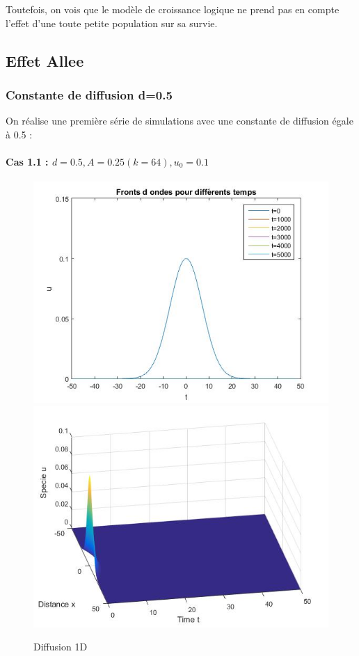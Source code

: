 \documentclass[a4paper,11pt]{article}
\begin{document}
Toutefois, on vois que le modèle de croissance logique ne prend pas en compte l'effet d'une toute petite population sur sa survie. 


\subsection{Effet Allee}

\subsubsection{Constante de diffusion d=0.5}
On réalise une première série de simulations avec une constante de diffusion égale à 0.5 :
\paragraph{Cas 1.1 : $d=0.5, A=0.25 (k=64), u_0=0.1$}
\noindent
\begin{figure}[H]
	\centering
	\includegraphics[width=0.40\linewidth]{Allee/F2311}\hfill
	\includegraphics[width=0.55\linewidth]{Allee/F4311}
    \caption{Diffusion 1D}
\end{figure}
\noindent
\end{document}
